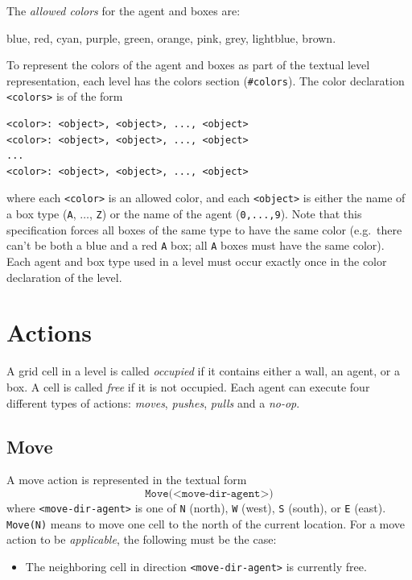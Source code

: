 \documentclass[12pt,a4paper]{article}
\begin{document}
The \emph{allowed colors} for the agent and boxes are:
\begin{center}
blue, red, cyan, purple, green, orange, pink, grey, lightblue, brown.
\end{center}
To represent the colors of the agent and boxes as part of the textual level representation, each level has the colors section (\texttt{\#colors}). The color declaration \texttt{<colors>} is of the form
\begin{verbatim}
<color>: <object>, <object>, ..., <object>
<color>: <object>, <object>, ..., <object>
...
<color>: <object>, <object>, ..., <object>
\end{verbatim}
where each \texttt{<color>} is an allowed color, and each \texttt{<object>} is either the name of a box type (\texttt{A}, $\dots$, \texttt{Z}) or the name of the agent (\texttt{0,...,9}). Note that this specification forces all boxes of the same type to have the same color (e.g.\ there can't be both a blue and a red \texttt{A} box; all \texttt{A} boxes must have the same color). Each agent and box type used in a level must occur exactly once in the color declaration of the level.


\section{Actions}\label{sect:actions}
A grid cell in a level is called \emph{occupied} if it contains either a wall, an agent, or a box. A cell is called \emph{free} if it is not occupied. Each agent can execute four different types of actions: \emph{moves}, \emph{pushes}, \emph{pulls} and a \emph{no-op}. 

\subsection{Move}
A move action is represented in the textual form
    \[
        \texttt{Move(<move-dir-agent>)}        
            \]
    where \texttt{<move-dir-agent>} is one of \texttt{N} (north), \texttt{W} (west), \texttt{S} (south), or \texttt{E} (east). \texttt{Move(N)} means to move one cell to the north of the current location. For a move action to be \emph{applicable}, the following must be the case:
    \begin{itemize}
        \item The neighboring cell in direction \texttt{<move-dir-agent>} is currently free.
    \end{itemize}
\end{document}
